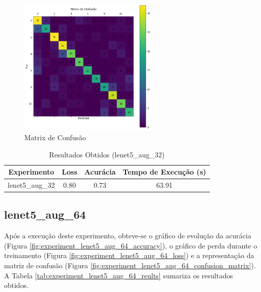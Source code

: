 \documentclass[12pt]{article}
\begin{document}
\begin{figure}[!htb]
  \centering
  \includegraphics[width=18em]{experiments/lenet5_aug_32/confusion_matrix.png}
  \caption{Matrix de Confusão}
  \label{fig:experiment_lenet5_aug_32_confusion_matrix}
\end{figure}

\begin{table}[!htb]
  \centering
  \begin{tabular}{|c|c|c|c|}
    \hline
    \textbf{Experimento} & \textbf{Loss} & \textbf{Acurácia} & \textbf{Tempo de Execução (s)} \\ \hline
    lenet5\_aug\_32      & 0.80          & 0.73              & 63.91                          \\ \hline
  \end{tabular}
  \caption{Resultados Obtidos (lenet5\_aug\_32)}
  \label{tab:experiment_lenet5_aug_32_reults}
\end{table}

\newpage

\subsection{lenet5\_aug\_64}

Após a execução deste experimento, obteve-se o gráfico de evolução da acurácia (Figura \ref{fig:experiment_lenet5_aug_64_accuracy}), o gráfico de perda durante o treinamento (Figura \ref{fig:experiment_lenet5_aug_64_loss}) e a representação da matriz de confusão (Figura \ref{fig:experiment_lenet5_aug_64_confusion_matrix}). A Tabela \ref{tab:experiment_lenet5_aug_64_reults} sumariza os resultados obtidos.
\end{document}
